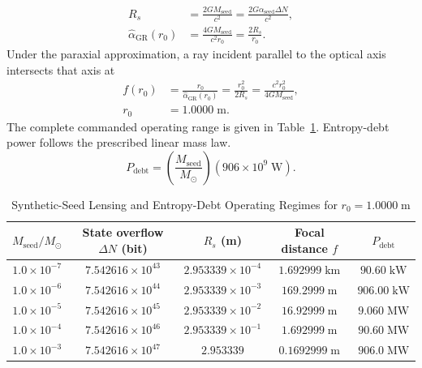 \documentclass[10pt,twocolumn]{IEEEtran}
\newcommand{\Msun}{M_{\odot}}
\begin{document}
\begin{equation}
\begin{aligned}
R_s &= \frac{2GM_{\mathrm{seed}}}{c^2}
=\frac{2G\alpha_{\mathrm{seed}}\Delta N}{c^2}, \\
\widehat{\alpha}_{\mathrm{GR}}(r_0)
&=\frac{4GM_{\mathrm{seed}}}{c^2r_0}
=\frac{2R_s}{r_0}.
\end{aligned}
\label{eq:rs_deflection}
\end{equation}
Under the paraxial approximation, a ray incident parallel to the optical axis intersects that axis at
\begin{equation}
\begin{aligned}
f(r_0)&=\frac{r_0}{\widehat{\alpha}_{\mathrm{GR}}(r_0)}
=\frac{r_0^2}{2R_s}
=\frac{c^2r_0^2}{4GM_{\mathrm{seed}}}, \\
r_0&=1.0000\;\mathrm{m}.
\end{aligned}
\label{eq:classical_focal_length}
\end{equation}
The complete commanded operating range is given in Table~\ref{tab:seed_regimes}. Entropy-debt power follows the prescribed linear mass law.
\begin{equation}
P_{\mathrm{debt}}=\left(\frac{M_{\mathrm{seed}}}{\Msun}\right)
\left(906\times10^9\;\mathrm{W}\right).
\label{eq:entropy_debt_section2}
\end{equation}

\begin{table}[t]
\caption{Synthetic-Seed Lensing and Entropy-Debt Operating Regimes for $r_0=1.0000\;\mathrm{m}$}
\label{tab:seed_regimes}
\centering
\footnotesize
\begin{tabular}{@{}ccccc@{}}
\toprule
$M_{\mathrm{seed}}/\Msun$ & State overflow $\Delta N$ (bit) & $R_s$ (m) & Focal distance $f$ & $P_{\mathrm{debt}}$ \\
\midrule
$1.0\times10^{-7}$ & $7.542616\times10^{43}$ & $2.953339\times10^{-4}$ & $1.692999\;\mathrm{km}$ & $90.60\;\mathrm{kW}$ \\
$1.0\times10^{-6}$ & $7.542616\times10^{44}$ & $2.953339\times10^{-3}$ & $169.2999\;\mathrm{m}$ & $906.00\;\mathrm{kW}$ \\
$1.0\times10^{-5}$ & $7.542616\times10^{45}$ & $2.953339\times10^{-2}$ & $16.92999\;\mathrm{m}$ & $9.060\;\mathrm{MW}$ \\
$1.0\times10^{-4}$ & $7.542616\times10^{46}$ & $2.953339\times10^{-1}$ & $1.692999\;\mathrm{m}$ & $90.60\;\mathrm{MW}$ \\
$1.0\times10^{-3}$ & $7.542616\times10^{47}$ & $2.953339$ & $0.1692999\;\mathrm{m}$ & $906.0\;\mathrm{MW}$ \\
\bottomrule
\end{tabular}
\end{table}
\end{document}
